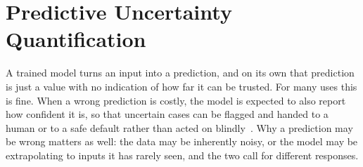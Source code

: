 
\section{Predictive Uncertainty Quantification}
\label{sec:bg:uncertainty}
A trained model turns an input into a prediction, and on its own that
prediction is just a value with no indication of how far it can be trusted.
For many uses this is fine. When a wrong prediction is costly, the model is
expected to also report how confident it is, so that uncertain cases can be
flagged and handed to a human or to a safe default rather than acted on
blindly~\cite{malinin2021}. Why a prediction may be wrong matters as well:
the data may be inherently noisy, or the model may be extrapolating to inputs
it has rarely seen, and the two call for different responses.


